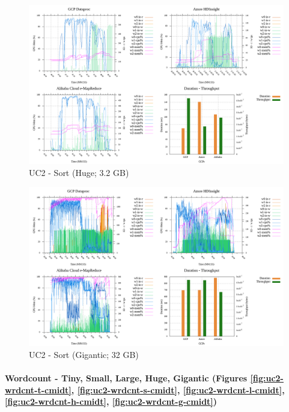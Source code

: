 \documentclass[review]{elsarticle}
\begin{document}
\begin{figure}[p]
	\caption{UC2 - Sort (Huge; 3.2 GB)}
	\label{fig:uc2-srt-h-cmidt}
	\includegraphics[width=\textwidth]{uc2-srt-h-cmidt}
	\centering
\end{figure}

\begin{figure}[p]
	\caption{UC2 - Sort (Gigantic; 32 GB)}
	\label{fig:uc2-srt-g-cmidt}
	\includegraphics[width=\textwidth]{uc2-srt-g-cmidt}
	\centering
\end{figure}


\paragraph{Wordcount - Tiny, Small, Large, Huge, Gigantic (Figures \ref{fig:uc2-wrdcnt-t-cmidt}, \ref{fig:uc2-wrdcnt-s-cmidt}, \ref{fig:uc2-wrdcnt-l-cmidt}, \ref{fig:uc2-wrdcnt-h-cmidt}, \ref{fig:uc2-wrdcnt-g-cmidt})}
\end{document}
